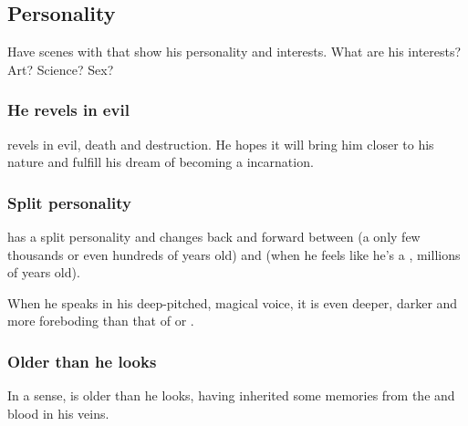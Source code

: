 \subsection{Personality}
Have scenes with \Vizsherioch{} that show his personality and interests. What are his interests? Art? Science? Sex?




\subsubsection{He revels in evil}
\Vizsherioch{} revels in evil, death and destruction. 
He hopes it will bring him closer to his \xsic{} nature and fulfill his dream of becoming a \xs{} incarnation.






\subsubsection{Split personality}
\Vizsherioch{} has a split personality and changes back and forward between  (a \dragon{} only few thousands or even hundreds of years old) and  (when he feels like he's a \xs, millions of years old). 

When he speaks in his deep-pitched, magical voice, it is even deeper, darker and more foreboding than that of \Ishnaruchaefir{} or \Secherdamon. 





\subsubsection{Older than he looks}
In a sense, \Vizsherioch{} is older than he looks, having inherited some memories from the \resphan{} and \xzaishann{} blood in his veins.

